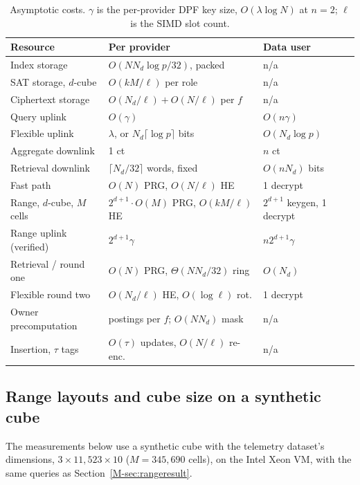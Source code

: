 \documentclass[11pt,a4paper]{article}
\newcommand{\mref}[1]{\ref{M-#1}}
\newlength{\tblwidth}\setlength{\tblwidth}{\linewidth}
\begin{document}
\begin{table}[htbp]
\caption{Asymptotic costs. $\gamma$ is the per-provider DPF key size,
$O(\lambda\log N)$ at $n=2$; $\ell$ is the SIMD slot count.}
\label{tab:complexity}
\centering
\scriptsize
\setlength{\tabcolsep}{2pt}
\renewcommand{\arraystretch}{1.2}
\begin{tabular*}{\tblwidth}{@{\extracolsep{\fill}}lll@{}}
\toprule
Resource & Per provider & Data user \\
\midrule
Index storage           & $O(N N_d\log p/32)$, packed       & n/a \\
SAT storage, $d$-cube   & $O(kM/\ell)$ per role               & n/a \\
Ciphertext storage      & $O(N_d/\ell)+O(N/\ell)$ per $f$   & n/a \\
Query uplink            & $O(\gamma)$                       & $O(n\gamma)$ \\
Flexible uplink         & $\lambda$, or $N_d\lceil\log p\rceil$ bits & $O(N_d\log p)$ \\
Aggregate downlink      & 1 ct                              & $n$ ct \\
Retrieval downlink      & $\lceil N_d/32\rceil$ words, fixed & $O(nN_d)$ bits \\
Fast path               & $O(N)$ PRG, $O(N/\ell)$ HE        & 1 decrypt \\
Range, $d$-cube, $M$ cells & $2^{d+1}\cdot O(M)$ PRG, $O(kM/\ell)$ HE & $2^{d+1}$ keygen, 1 decrypt \\
Range uplink (verified) & $2^{d+1}\gamma$                   & $n2^{d+1}\gamma$ \\
Retrieval / round one   & $O(N)$ PRG, $\Theta(NN_d/32)$ ring & $O(N_d)$ \\
Flexible round two      & $O(N_d/\ell)$ HE, $O(\log\ell)$ rot.& 1 decrypt \\
Owner precomputation    & postings per $f$; $O(NN_d)$ mask  & n/a \\
Insertion, $\tau$ tags  & $O(\tau)$ updates, $O(N/\ell)$ re-enc. & n/a \\
\bottomrule
\end{tabular*}
\end{table}

\subsection{Range layouts and cube size on a synthetic cube}
\label{sec:rangesynth}
The measurements below use a synthetic cube with the telemetry dataset's dimensions, $3\times11{,}523\times10$ ($M=345{,}690$ cells), on the Intel Xeon VM, with the same queries as Section~\mref{sec:rangeresult}.
\end{document}
